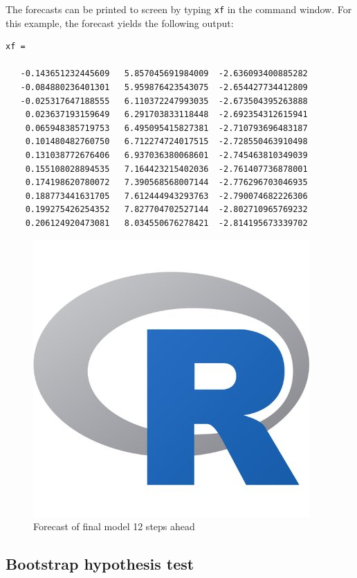 \documentclass[article]{jss}
\begin{document}
The forecasts can be printed to screen by typing \verb|xf| in the command window. For this example, the forecast yields the following output:
\begin{verbatim}
xf =

   -0.143651232445609   5.857045691984009  -2.636093400885282
   -0.084880236401301   5.959876423543075  -2.654427734412809
   -0.025317647188555   6.110372247993035  -2.673504395263888
    0.023637193159649   6.291703833118448  -2.692354312615941
    0.065948385719753   6.495095415827381  -2.710793696483187
    0.101480482760750   6.712274724017515  -2.728550463910498
    0.131038772676406   6.937036380068601  -2.745463810349039
    0.155108028894535   7.164423215402036  -2.761407736878001
    0.174198620780072   7.390568568007144  -2.776296703046935
    0.188773441631705   7.612444943293763  -2.790074682226306
    0.199275426254352   7.827704702527144  -2.802710965769232
    0.206124920473081   8.034550676278421  -2.814195673339702
\end{verbatim}

\begin{figure}[H]
  \centering
  \caption{Forecast of final model 12 steps ahead}
  \label{fig:forecast}
  \includegraphics[scale = 1, keepaspectratio=true]{Figures/forecast.png}
\end{figure}

\subsection{Bootstrap hypothesis test}
\label{sec:bootstr-hypoth-test}
\end{document}
